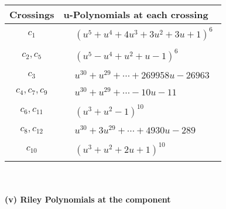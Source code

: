 \documentclass[1p]{elsarticle_modified}
\theoremstyle{definition}
\begin{document}
\begin{tabular}{m{50pt}|m{274pt}}
Crossings & \hspace{64pt}u-Polynomials at each crossing \\
\hline $$\begin{aligned}c_{1}\end{aligned}$$&$\begin{aligned}
&(u^5+u^4+4 u^3+3 u^2+3 u+1)^6
\end{aligned}$\\
\hline $$\begin{aligned}c_{2},c_{5}\end{aligned}$$&$\begin{aligned}
&(u^5- u^4+u^2+u-1)^6
\end{aligned}$\\
\hline $$\begin{aligned}c_{3}\end{aligned}$$&$\begin{aligned}
&u^{30}+u^{29}+\cdots+269958 u-26963
\end{aligned}$\\
\hline $$\begin{aligned}c_{4},c_{7},c_{9}\end{aligned}$$&$\begin{aligned}
&u^{30}+u^{29}+\cdots-10 u-11
\end{aligned}$\\
\hline $$\begin{aligned}c_{6},c_{11}\end{aligned}$$&$\begin{aligned}
&(u^3+u^2-1)^{10}
\end{aligned}$\\
\hline $$\begin{aligned}c_{8},c_{12}\end{aligned}$$&$\begin{aligned}
&u^{30}+3 u^{29}+\cdots+4930 u-289
\end{aligned}$\\
\hline $$\begin{aligned}c_{10}\end{aligned}$$&$\begin{aligned}
&(u^3+u^2+2 u+1)^{10}
\end{aligned}$\\
\hline
\end{tabular}\\~\\
\newpage\renewcommand{\arraystretch}{1}
\flushleft \textbf{(v) Riley Polynomials at the component}\newline \\
\end{document}
